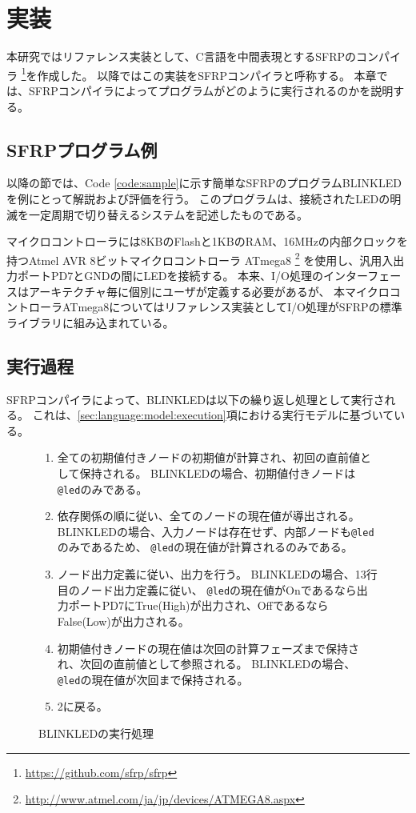 \chapter{実装}\label{sec:implementation}
本研究ではリファレンス実装として、C言語を中間表現とするSFRPのコンパイラ
\footnote{\url{https://github.com/sfrp/sfrp}}を作成した。
以降ではこの実装をSFRPコンパイラと呼称する。
本章では、SFRPコンパイラによってプログラムがどのように実行されるのかを説明する。

\section{SFRPプログラム例}\label{sec:implementation:example}
以降の節では、Code \ref{code:sample}に示す簡単なSFRPのプログラムBLINKLEDを例にとって解説および評価を行う。
このプログラムは、接続されたLEDの明滅を一定周期で切り替えるシステムを記述したものである。

マイクロコントローラには8KBのFlashと1KBのRAM、16MHzの内部クロックを持つAtmel AVR 8ビットマイクロコントローラ ATmega8
\footnote{\url{http://www.atmel.com/ja/jp/devices/ATMEGA8.aspx}}
を使用し、汎用入出力ポートPD7とGNDの間にLEDを接続する。
本来、I/O処理のインターフェースはアーキテクチャ毎に個別にユーザが定義する必要があるが、
本マイクロコントローラATmega8についてはリファレンス実装としてI/O処理がSFRPの標準ライブラリに組み込まれている。

\newpage



\section{実行過程}\label{sec:implementation:execution}
SFRPコンパイラによって、BLINKLEDは以下の繰り返し処理として実行される。
これは、\ref{sec:language:model:execution}項における実行モデルに基づいている。
\begin{figure}[h]
\begin{screen}
\begin{enumerate}
  \item 全ての初期値付きノードの初期値が計算され、初回の直前値として保持される。
    BLINKLEDの場合、初期値付きノードは\texttt{@led}のみである。
  \item 依存関係の順に従い、全てのノードの現在値が導出される。
    BLINKLEDの場合、入力ノードは存在せず、内部ノードも\texttt{@led}のみであるため、
    \texttt{@led}の現在値が計算されるのみである。
  \item ノード出力定義に従い、出力を行う。
    BLINKLEDの場合、13行目のノード出力定義に従い、
    \texttt{@led}の現在値がOnであるなら出力ポートPD7にTrue(High)が出力され、OffであるならFalse(Low)が出力される。
  \item 初期値付きノードの現在値は次回の計算フェーズまで保持され、次回の直前値として参照される。
    BLINKLEDの場合、\texttt{@led}の現在値が次回まで保持される。
  \item 2に戻る。
\end{enumerate}
\end{screen}
\caption{BLINKLEDの実行処理}
\label{fig:imp:exec}
\end{figure}

